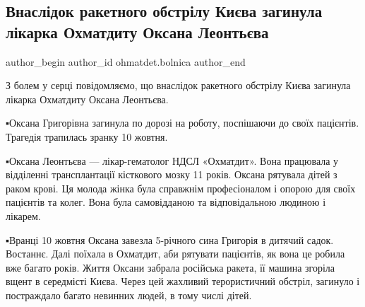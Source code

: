  
 
 
 
 
 
\subsection{Внаслідок ракетного обстрілу Києва загинула лікарка Охматдиту Оксана Леонтьєва}
\label{sec:11_10_2022.fb.ohmatdet.bolnica.1.oksana_leontjeva}
 
\ifcmt
 author_begin
   author_id ohmatdet.bolnica
 author_end
\fi


З болем у серці повідомляємо, що внаслідок ракетного обстрілу Києва загинула
лікарка Охматдиту Оксана Леонтьєва.🙏

▪️Оксана Григорівна загинула по дорозі на роботу, поспішаючи до своїх пацієнтів.
Трагедія трапилась зранку 10 жовтня. 

▪️Оксана Леонтьєва — лікар-гематолог НДСЛ «Охматдит». Вона працювала у
відділенні трансплантації кісткового мозку 11 років. Оксана рятувала дітей з
раком крові. Ця молода жінка була справжнім професіоналом і опорою для своїх
пацієнтів та колег. Вона була самовідданою та відповідальною людиною і лікарем. 

▪️Вранці 10 жовтня Оксана завезла 5-річного сина Григорія в дитячий садок.
Востаннє. Далі поїхала в Охматдит, аби рятувати пацієнтів, як вона це робила
вже багато років. Життя Оксани забрала російська ракета, її машина згоріла
вщент в середмісті Києва. Через цей жахливий терористичний обстріл, загинуло і
постраждало багато невинних людей, в тому числі дітей. 

